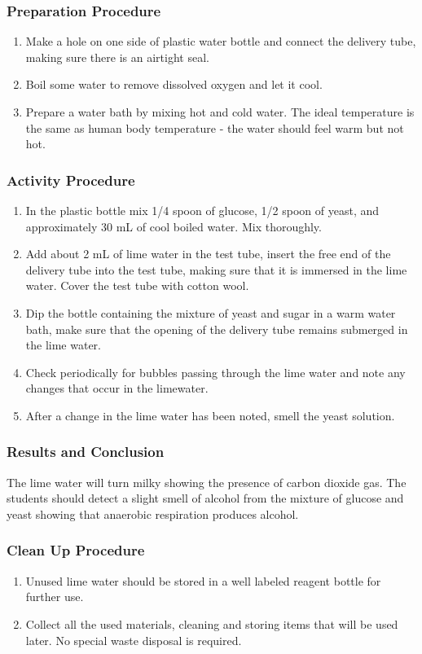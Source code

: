 \subsubsection*{Preparation Procedure}
\begin{enumerate}
\item{Make a hole on one side of plastic water bottle and connect the delivery tube, making sure there is an airtight seal.}
\item{Boil some water to remove dissolved oxygen and let it cool.}
\item{Prepare a water bath by mixing hot and cold water. The ideal temperature is the same as human body temperature - the water should feel warm but not hot.}
\end{enumerate}

\subsubsection*{Activity Procedure}
\begin{enumerate}
\item{In the plastic bottle mix 1/4 spoon of glucose, 1/2 spoon of yeast, and approximately 30 mL of cool boiled water. Mix thoroughly.}
\item{Add about 2 mL of lime water in the test tube, insert the free end of the delivery tube into the test tube, making sure that it is immersed in the lime water. Cover the test tube with cotton wool.}
\item{Dip the bottle containing the mixture of yeast and sugar in a warm water bath, make sure that the opening of the delivery tube remains submerged in the lime water.}
\item{Check periodically for bubbles passing through the lime water and note any changes that occur in the limewater.}
\item{After a change in the lime water has been noted, smell the yeast solution.}
\end{enumerate}

\subsubsection*{Results and Conclusion}
The lime water will turn milky showing the presence of carbon dioxide gas.
The students should detect a slight smell of alcohol from the mixture of glucose and yeast showing that anaerobic respiration produces alcohol.

\subsubsection*{Clean Up Procedure}
\begin{enumerate}
\item{Unused lime water should be stored in a well labeled reagent bottle for further use.}
\item{Collect all the used materials, cleaning and storing items that will be used later. No special waste disposal is required.}
\end{enumerate}

